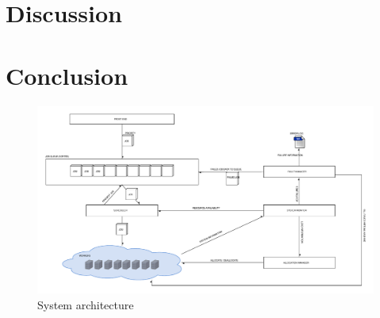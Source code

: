 \documentclass[a4paper]{IEEEtran}
\begin{document}
\section{Discussion}

\section{Conclusion}

\begin{thebibliography}{9}

\end{thebibliography}


\newpage

\begin{landscape}
\appendix

\begin{figure}[h]
\centering
\includegraphics[width=770pt]{"System Architecture 2"}
\caption{System architecture}
\label{fig_sysarch}
\end{figure}
\end{landscape}
\clearpage
\end{document}

